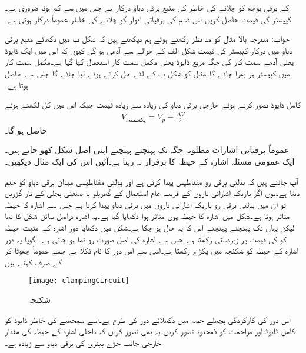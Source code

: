  کے برقی بوجھ کو چلانے کی خاطر  کی منبع برقی دباو درکار ہے جس میں   سے کم ہونا ضروری ہے۔کپیسٹر کی قیمت حاصل کریں۔اس قسم کی  برقیاتی ادوار کو چلانے کی خاطر عموماً درکار ہوتی ہے۔

جواب: 
مندرجہ بالا مثال کو مد نظر رکھتے ہوئے ہم دیکھتے ہیں کہ شکل  ب میں دکھائے منبع برقی دباو میں درکار کپیسٹر کی قیمت شکل  الف کے حوالے سے آدھی ہو گی کیوں کہ اس میں ایک ڈایوڈ یعنی آدھے سمت کار کی جگہ مربع ڈایوڈ یعنی مکمل سمت کار استعمال کیا گیا ہے۔مکمل سمت کار میں کپیسٹر ہر  بھرا جائے گا۔مثال  کو شکل  ب کے لئے حل کرتے ہوئے  لیا جائے گا جس سے  حاصل ہوتا ہے۔ 
 
کامل ڈایوڈ تصور کرتے ہوئے خارجی برقی دباو کی زیادہ سے زیادہ قیمت  جبکہ اس میں کل   لکھتے ہوئے
\begin{align}
V_{\text{یکسمتی}}=V_p-\frac{\Delta V}{2}
\end{align}
حاصل ہو گا۔

عموماً برقیاتی اشارات مطلوبہ جگہ تک پہنچتے پہنچتے اپنی اصل شکل کھو جاتے ہیں۔ ایک عمومی مسئلہ اشارہ کے حیطہ کا برقرار نہ رہنا ہے۔آئیں اس کی ایک مثال دیکھیں۔

آپ جانتے ہیں کہ بدلتی برقی رو مقناطیس پیدا کرتی ہے اور بدلتی مقناطیسی میدان برقی دباو کو جنم دیتا ہے۔یوں اگر باریک اشاراتی تاروں کے قریب عام استعمال کے گھریلو یا صنعتی بجلی کے تار گزریں تو ان میں بدلتی برقی رو باریک اشاراتی تاروں میں برقی دباو پیدا کرتا ہے جس سے اشارہ کا حیطہ متاثر ہوتا ہے۔شکل   میں اشارہ   کا حیطہ یوں متاثر ہوا دکھایا گیا ہے۔یہ اشارہ دراصل سائن شکل کا تھا لیکن یہاں تک پہنچتے پہنچتے اس کا یہ حال ہو چکا ہے۔شکل   میں دکھایا دور اشارہ کے مثبت حیطہ کو  کی قیمت پر زبردستی رکھتا ہے جس سے اشارہ کی اصل صورت رو نما ہو جاتی ہے۔ گویا یہ دور اشارہ کے حیطہ کو شکنجہ میں پکڑے رکھتا ہے۔اسی سے اس دور کا نام   نکلا ہے جسے عموماً چھوٹا  کر کے صرف  کہتے ہیں
\begin{figure}
\centering
\texttt{[image: clampingCircuit]}
\caption{شکنجہ}
\label{شکل_شکنجہ}
\end{figure}
اس دور کی کارکردگی پچھلے حصہ میں دکھلائے دور کی طرح ہے۔اسے سمجھنے کی خاطر ڈایوڈ   کو کامل ڈایوڈ اور مزاحمت  کو لامحدود تصور کریں۔یہ بھی تصور کریں کہ داخلی اشارہ  کے حیطہ  کی مقدار خارجی جانب جڑے بیٹری کی برقی دباو  سے زیادہ ہے۔


